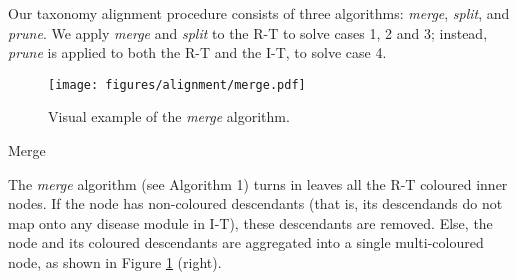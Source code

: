 \documentclass[journal,twoside,web]{ieeecolor}
\begin{document}
Our taxonomy alignment procedure consists of three algorithms: \textit{merge}, \textit{split}, and \textit{prune}. We apply \textit{merge} and \textit{split} to the R-T to solve  cases 1, 2 and 3; instead, \textit{prune} is applied to both the R-T and the I-T, to solve  case 4.  
\begin{figure}[ht!]
\centering
\texttt{[image: figures/alignment/merge.pdf]}
\caption{Visual example of the \textit{merge} algorithm.}
\label{fig:merge}
\end{figure}
\begin{algorithm}
\begin{footnotesize}
\SetAlgoLined

\label{algo:merge}
\end{footnotesize}
\caption{Merge}
\end{algorithm}
The \textit{merge} algorithm (see Algorithm  %
1) turns in leaves all the R-T coloured inner nodes. If the node has non-coloured descendants (that is, its descendands do not map onto any disease module in I-T), these descendants are  removed. Else, the node and its coloured descendants are aggregated into a single multi-coloured node, as shown in Figure  \ref{fig:merge} (right). 
\end{document}
